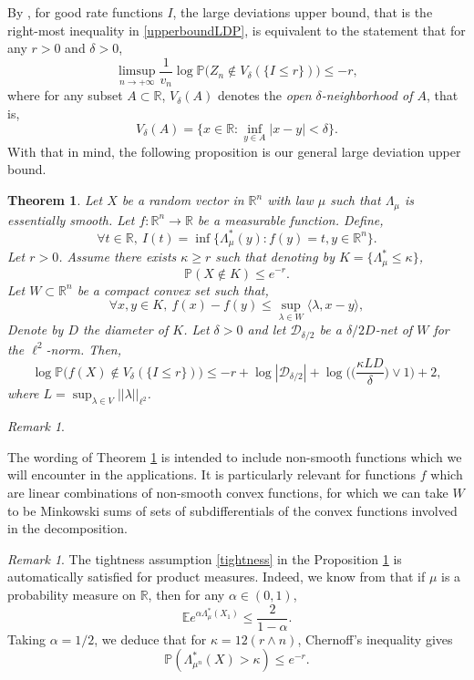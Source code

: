 \documentclass[aop,preprint]{imsart}
\newcommand\RR{\mathbb{R}}
\newcommand\PP{\mathbb{P}}
\newcommand\EE{\mathbb{E}}
\numberwithin{equation}{section}
\theoremstyle{definition}
\theoremstyle{plain}
\newtheorem{The}[Def]{Theorem}
\theoremstyle{remark}
\newtheorem{Rem}[Def]{Remark}
\begin{document}
By \cite[(1.2.7)]{DZ}, for good rate functions $I$, the large deviations upper bound, that is the right-most inequality in \eqref{upperboundLDP}, is equivalent to the statement that for any $r>0$ and $\delta>0$, 
$$ \limsup_{n\to +\infty} \frac{1}{v_n} \log \PP\big( Z_n \notin V_{\delta}(\{I\leq r\}) \big) \leq - r,$$
where for any subset $A \subset \RR$,  $V_{\delta}(A)$ denotes the \textit{open $\delta$-neighborhood of $A$}, that is,
$$ V_{\delta}(A) = \big\{ x \in \RR : \inf_{y \in A} |x-y|< \delta\big\}.$$
With that in mind, the following proposition is our general large deviation upper bound.
\begin{The}\label{NL}
Let $X$ be a random vector in $\RR^n$ with law $\mu$ such that $\Lambda_\mu$ is essentially smooth. Let $f : \RR^n \to \RR$ be a measurable function. Define,
$$\forall t \in \RR, \  I(t) = \inf \{ \Lambda^*_{\mu}(y) : f(y)= t, y \in \RR^n \}.$$
Let $r>0$. Assume there exists $\kappa\geq r$ such that denoting by $K = \{ \Lambda^*_\mu \leq \kappa\}$,
\begin{equation} \label{tightness}\PP(X\notin  K)\leq e^{-r}.\end{equation}
Let $W \subset \RR^n$ be a compact convex set such that, 
\begin{equation} \label{meanvalueass} \forall x,y \in K, \ f(x)-f(y) \leq \sup_{\lambda \in W} \langle \lambda, x-y\rangle,\end{equation}
Denote by $D$ the diameter of $K$. Let $\delta>0$  and let $\mathcal{D}_{\delta/2}$ be a $\delta/2D$-net of $W$ for the $\ell^2$-norm.
 Then,
$$\log \PP\big( f(X) \notin V_{\delta}(\{I\leq r\}) \big) \leq -r +\log|\mathcal{D}_{\delta/2}|+ \log\Big(\Big( \frac{\kappa LD }{\delta}\Big)\vee 1\Big)  + 2,$$
where $L = \sup_{\lambda \in V} ||\lambda ||_{\ell^2}$.
\end{The}
\begin{Rem} \label{smooth}


The wording of Theorem \ref{NL} is intended to include non-smooth functions which we will encounter in the applications. It is particularly relevant for  functions $f$ which are linear combinations of non-smooth convex functions, for which we can take $W$ to be  Minkowski sums of sets of subdifferentials of the convex functions involved in the decomposition.










\end{Rem}
\begin{Rem}\label{prod}
The tightness assumption \eqref{tightness} in the Proposition \ref{NL} is automatically satisfied for product measures. Indeed, 
we know from \cite[Lemma 5.1.14]{DZ} that if $\mu$ is a probability measure on $\RR$, then for any $\alpha \in(0,1)$,
$$ \EE e^{\alpha \Lambda^*_{\mu}(X_1)} \leq \frac{2}{1-\alpha}.$$
Taking $\alpha = 1/2$, we deduce that for $\kappa = 12(r\wedge n)$, Chernoff's inequality gives
$$ \PP( \Lambda^*_{\mu^n}(X) > \kappa ) \leq e^{-r}.$$
\end{Rem}
\end{document}

